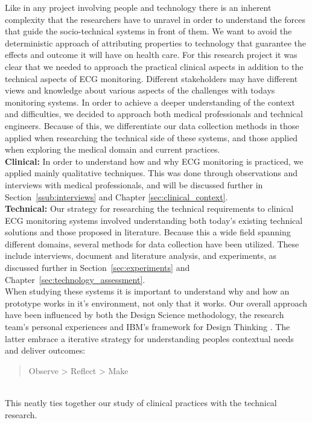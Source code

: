 Like in any project involving people and technology there is an inherent complexity that the researchers have to unravel in order to understand the forces that guide the socio-technical systems in front of them. We want to avoid the deterministic approach of attributing properties to technology that guarantee the effects and outcome it will have on health care. For this research project it was clear that we needed to approach the practical clinical aspects in addition to the technical aspects of ECG monitoring. Different stakeholders may have different views and knowledge about various aspects of the challenges with todays monitoring systems. In order to achieve a deeper understanding of the context and difficulties, we decided to approach both medical professionals and technical engineers. Because of this, we differentiate our data collection methods in those applied when researching the technical side of these systems, and those applied when exploring the medical domain and current practices.\\
\newline
\noindent
\textbf{Clinical:} In order to understand how and why ECG monitoring is practiced, we applied mainly qualitative techniques. This was done through observations and interviews with medical professionals, and will be discussed further in Section~\ref{ssub:interviews} and Chapter \ref{sec:clinical_context}.\\
\newline
\noindent
\textbf{Technical:} Our strategy for researching the technical requirements to clinical ECG monitoring systems involved understanding both today's existing technical solutions and those proposed in literature. Because this a wide field spanning different domains, several methods for data collection have been utilized. These include interviews, document and literature analysis, and experiments, as discussed further in Section~\ref{sec:experiments} and Chapter~\ref{sec:technology_assessment}.
\\
\newline
\noindent
When studying these systems it is important to understand why and how an prototype works in it's environment, not only that it works. Our overall approach have been influenced by both the Design Science methodology, the research team's personal experiences and IBM's framework for Design Thinking \cite{ibmDesignThinking}. The latter embrace a iterative strategy for understanding peoples contextual needs and deliver outcomes:

\begin{quote} 
Observe > Reflect > Make
\end{quote}
\\
\noindent
This neatly ties together our study of clinical practices with the technical research.


